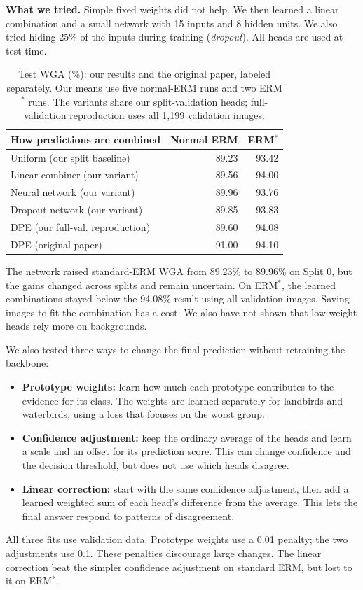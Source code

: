\documentclass[runningheads]{llncs}
\begin{document}
\textbf{What we tried.} Simple fixed weights did not help. We then learned a linear combination and a small network with 15 inputs and 8 hidden units. We also tried hiding 25\% of the inputs during training (\emph{dropout}). All heads are used at test time.

\begin{table}[H]
\centering
\caption{Test WGA (\%): our results and the original paper, labeled separately. Our means use five normal-ERM runs and two ERM$^*$ runs. The variants share our split-validation heads; full-validation reproduction uses all 1,199 validation images.}
\label{tab:combinations}
\small
\setlength{\tabcolsep}{5pt}
\begin{tabular}{@{}lrr@{}}
\toprule
How predictions are combined & Normal ERM & ERM$^*$\\
\midrule
Uniform (our split baseline) & 89.23 & 93.42\\
Linear combiner (our variant) & 89.56 & 94.00\\
Neural network (our variant) & 89.96 & 93.76\\
Dropout network (our variant) & 89.85 & 93.83\\
\midrule
DPE (our full-val. reproduction) & 89.60 & 94.08\\
\midrule
DPE (original paper) & 91.00 & 94.10\\
\bottomrule
\end{tabular}
\end{table}

The network raised standard-ERM WGA from 89.23\% to 89.96\% on Split 0, but the gains changed across splits and remain uncertain. On ERM$^*$, the learned combinations stayed below the 94.08\% result using all validation images. Saving images to fit the combination has a cost. We also have not shown that low-weight heads rely more on backgrounds.

We also tested three ways to change the final prediction without retraining the backbone:
\begin{itemize}
\item \textbf{Prototype weights:} learn how much each prototype contributes to the evidence for its class. The weights are learned separately for landbirds and waterbirds, using a loss that focuses on the worst group.
\item \textbf{Confidence adjustment:} keep the ordinary average of the heads and learn a scale and an offset for its prediction score. This can change confidence and the decision threshold, but does not use which heads disagree.
\item \textbf{Linear correction:} start with the same confidence adjustment, then add a learned weighted sum of each head's difference from the average. This lets the final answer respond to patterns of disagreement.
\end{itemize}
All three fits use validation data. Prototype weights use a 0.01 penalty; the two adjustments use 0.1. These penalties discourage large changes. The linear correction beat the simpler confidence adjustment on standard ERM, but lost to it on ERM$^*$.
\end{document}
